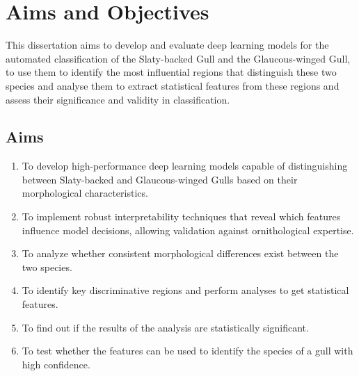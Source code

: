 \documentclass[a4paper,12pt]{report}
\begin{document}



\chapter{Aims and Objectives}

This dissertation aims to develop and evaluate deep learning models for the automated classification of the Slaty-backed Gull and the Glaucous-winged Gull, to use them to identify the most influential regions that distinguish these two species and analyse them to extract statistical features from these regions and assess their significance and validity in classification.

\section{Aims}
\begin{enumerate}
    \item To develop high-performance deep learning models capable of distinguishing between Slaty-backed and Glaucous-winged Gulls based on their morphological characteristics.
    \item To implement robust interpretability techniques that reveal which features influence model decisions, allowing validation against ornithological expertise.
    \item To analyze whether consistent morphological differences exist between the two species. 
    \item To identify key discriminative regions and perform analyses to get statistical features.
    \item To find out if the results of the analysis are statistically significant.
    \item To test whether the features can be used to identify the species of a gull with high confidence.
\end{enumerate}
\end{document}
